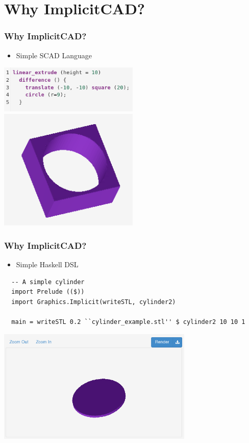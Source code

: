 \documentclass{beamer}
\begin{document}
\section{Why ImplicitCAD?}
\begin{frame}
  \frametitle{Why ImplicitCAD?}
\begin{itemize}
\item Simple SCAD Language
\end{itemize}
\includegraphics[width=0.5\textwidth, center]{website-simple_example_text.png}
\includegraphics[width=0.5\textwidth, center]{website-simple_example_graphic.png}
\end{frame}

\begin{frame}[fragile]
  \frametitle{Why ImplicitCAD?}
  \lstset{basicstyle=\ttfamily\scriptsize}
\begin{itemize}
\item Simple Haskell DSL
\end{itemize}
\begin{lstlisting}
  -- A simple cylinder
  import Prelude (($))
  import Graphics.Implicit(writeSTL, cylinder2)

  main = writeSTL 0.2 ``cylinder_example.stl'' $ cylinder2 10 10 1
\end{lstlisting}
    \includegraphics[width=0.7\textwidth, center]{implicitcad-cylinder.png}
\end{frame}
\end{document}
